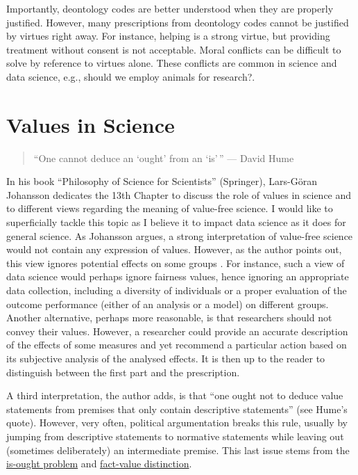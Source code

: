 \documentclass[
]{book}
\begin{document}
Importantly, deontology codes are better understood when they are properly justified. However, many prescriptions from deontology codes cannot be justified by virtues right away. For instance, helping is a strong virtue, but providing treatment without consent is not acceptable. Moral conflicts can be difficult to solve by reference to virtues alone. These conflicts are common in science and data science, e.g., should we employ animals for research?.

\hypertarget{values-in-science}{%
\section{Values in Science}\label{values-in-science}}

\begin{quote}
``One cannot deduce an `ought' from an `is'\,'' --- David Hume
\end{quote}

In his book ``Philosophy of Science for Scientists'' (Springer), Lars-Göran Johansson dedicates the 13th Chapter to discuss the role of values in science and to different views regarding the meaning of value-free science. I would like to superficially tackle this topic as I believe it to impact data science as it does for general science. As Johansson argues, a strong interpretation of value-free science would not contain any expression of values. However, as the author points out, this view ignores potential effects on some groups \citep{johansson2016philosophy}. For instance, such a view of data science would perhaps ignore fairness values, hence ignoring an appropriate data collection, including a diversity of individuals or a proper evaluation of the outcome performance (either of an analysis or a model) on different groups. Another alternative, perhaps more reasonable, is that researchers should not convey their values. However, a researcher could provide an accurate description of the effects of some measures and yet recommend a particular action based on its subjective analysis of the analysed effects. It is then up to the reader to distinguish between the first part and the prescription.

A third interpretation, the author adds, is that ``one ought not to deduce value statements from premises that only contain descriptive statements'' (see Hume's quote). However, very often, political argumentation breaks this rule, usually by jumping from descriptive statements to normative statements while leaving out (sometimes deliberately) an intermediate premise. This last issue stems from the \href{https://en.wikipedia.org/wiki/Is\%E2\%80\%93ought_problem}{is-ought problem} and \href{https://en.wikipedia.org/wiki/Fact\%E2\%80\%93value_distinction}{fact-value distinction}.
\end{document}
